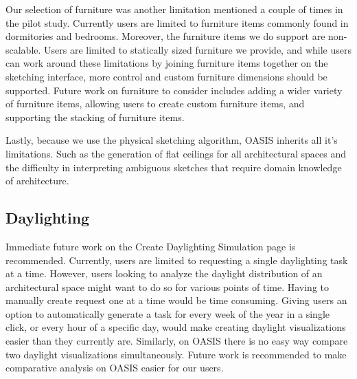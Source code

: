 	Our selection of furniture was another limitation mentioned a couple of times in the pilot study. Currently users are limited to furniture items commonly found in dormitories and bedrooms. Moreover, the furniture items we do support are non-scalable. Users are limited to statically sized furniture we provide, and while users can work around these limitations by joining furniture items together on the sketching interface, more control and custom furniture dimensions should be supported. Future work on furniture to consider includes adding a wider variety of furniture items, allowing users to create custom furniture items, and supporting the stacking of furniture items.


	Lastly, because we use the physical sketching algorithm, OASIS inherits all it's limitations. Such as the generation of flat ceilings for all architectural spaces and the difficulty in interpreting ambiguous sketches that require domain knowledge of architecture.




\subsection{Daylighting}


		Immediate future work on the {Create Daylighting Simulation} page is recommended. Currently, users are limited to requesting a single daylighting task at a time. However, users looking to analyze the daylight distribution of an architectural space might want to do so for various points of time.
		Having to manually create request one at a time would be time consuming. 
		Giving users an option to automatically generate a task for every week of the year in a single click, or every hour of a specific day, would make creating daylight visualizations easier than they currently are. 
		Similarly, on OASIS there is no easy way compare two daylight visualizations simultaneously. Future work is recommended to make comparative analysis on OASIS easier for our users.

